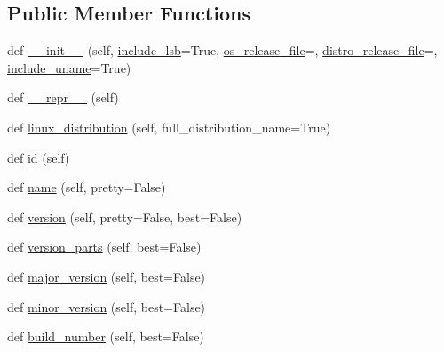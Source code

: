 \subsection*{Public Member Functions}
\begin{DoxyCompactItemize}
\item 
def \hyperlink{classpip_1_1__vendor_1_1distro_1_1LinuxDistribution_afa7f53e289ee8fa158ffd45ef59bf110}{\+\_\+\+\_\+init\+\_\+\+\_\+} (self, \hyperlink{classpip_1_1__vendor_1_1distro_1_1LinuxDistribution_a7ecb7e06b4f56986219d9c00106a188b}{include\+\_\+lsb}=True, \hyperlink{classpip_1_1__vendor_1_1distro_1_1LinuxDistribution_affacba40460a4f69535a5d4fef9fef8f}{os\+\_\+release\+\_\+file}=\textquotesingle{}\textquotesingle{}, \hyperlink{classpip_1_1__vendor_1_1distro_1_1LinuxDistribution_aba99e38b84002f3378072a4c916fad47}{distro\+\_\+release\+\_\+file}=\textquotesingle{}\textquotesingle{}, \hyperlink{classpip_1_1__vendor_1_1distro_1_1LinuxDistribution_af0fda24c21eb8e75a4552b7e842f1521}{include\+\_\+uname}=True)
\item 
def \hyperlink{classpip_1_1__vendor_1_1distro_1_1LinuxDistribution_a88c8c00cbb4c36365cf60754c3bdc5fa}{\+\_\+\+\_\+repr\+\_\+\+\_\+} (self)
\item 
def \hyperlink{classpip_1_1__vendor_1_1distro_1_1LinuxDistribution_a9deb9d70ba82d370ba5fd4b1ac7473e6}{linux\+\_\+distribution} (self, full\+\_\+distribution\+\_\+name=True)
\item 
def \hyperlink{classpip_1_1__vendor_1_1distro_1_1LinuxDistribution_a116be2692b0f408214126c823ce11add}{id} (self)
\item 
def \hyperlink{classpip_1_1__vendor_1_1distro_1_1LinuxDistribution_a7bbcbb9f1bf561b231f594b5bb251dbc}{name} (self, pretty=False)
\item 
def \hyperlink{classpip_1_1__vendor_1_1distro_1_1LinuxDistribution_a0c37e11aca02766e25025a395c09dd8b}{version} (self, pretty=False, best=False)
\item 
def \hyperlink{classpip_1_1__vendor_1_1distro_1_1LinuxDistribution_a75cf0bb28d95514dc96425ef8c192660}{version\+\_\+parts} (self, best=False)
\item 
def \hyperlink{classpip_1_1__vendor_1_1distro_1_1LinuxDistribution_a506c0bccc9c7486786b399ef3d0ac122}{major\+\_\+version} (self, best=False)
\item 
def \hyperlink{classpip_1_1__vendor_1_1distro_1_1LinuxDistribution_a56ce7b60ce6e6d469ef2ca23999dbbc7}{minor\+\_\+version} (self, best=False)
\item 
def \hyperlink{classpip_1_1__vendor_1_1distro_1_1LinuxDistribution_a6f133fc881eea68a8fd21dde923639f3}{build\+\_\+number} (self, best=False)

\end{DoxyCompactItemize}
